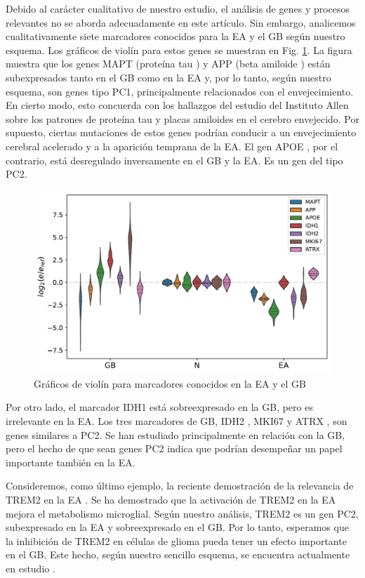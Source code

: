 Debido al carácter cualitativo de nuestro estudio, el análisis de genes y procesos relevantes no se aborda adecuadamente en este artículo. Sin embargo, analicemos cualitativamente siete marcadores conocidos para la EA y el GB según nuestro esquema. Los gráficos de violín para estos genes se muestran en Fig. \ref{fig:violin}. La figura muestra que los genes MAPT (proteína tau \cite{Strang_2019}) y APP (beta amiloide \cite{TCW_2016}) están subexpresados tanto en el GB como en la EA y, por lo tanto, según nuestro esquema, son genes tipo PC1, principalmente relacionados con el envejecimiento. En cierto modo, esto concuerda con los hallazgos del estudio del Instituto Allen sobre los patrones de proteína tau y placas amiloides en el cerebro envejecido. Por supuesto, ciertas mutaciones de estos genes podrían conducir a un envejecimiento cerebral acelerado y a la aparición temprana de la EA. El gen APOE \cite{Raulin_2022}, por el contrario, está desregulado inversamente en el GB y la EA. Es un gen del tipo PC2.

\begin{figure}[!htb]
	\centering
	\includegraphics[width=\linewidth]{figures/suppl2}
	\caption{Gráficos de violín para marcadores conocidos en la EA y el GB}
	\label{fig:violin}
\end{figure}

Por otro lado, el marcador IDH1 \cite{Cohen_2013} está sobreexpresado en la GB, pero es irrelevante en la EA. Los tres marcadores de GB, IDH2 \cite{Cohen_2013}, MKI67 \cite{Chen_2015} y ATRX \cite{Haase_2018}, son genes similares a PC2. Se han estudiado principalmente en relación con la GB, pero el hecho de que sean genes PC2 indica que podrían desempeñar un papel importante también en la EA.

Consideremos, como último ejemplo, la reciente demostración de la relevancia de TREM2 en la EA \cite{van_Lengerich_2023}. Se ha demostrado que la activación de TREM2 en la EA mejora el metabolismo microglial. Según nuestro análisis, TREM2 es un gen PC2, subexpresado en la EA y sobreexpresado en el GB. Por lo tanto, esperamos que la inhibición de TREM2 en células de glioma pueda tener un efecto importante en el GB. Este hecho, según nuestro sencillo esquema, se encuentra actualmente en estudio \cite{Sun_2023}.

